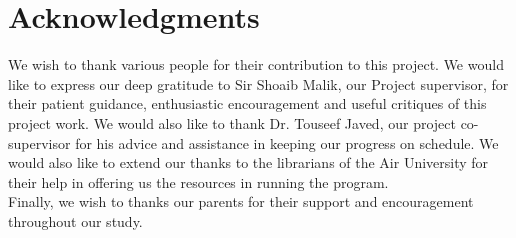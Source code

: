 \chapter*{Acknowledgments}

We wish to thank various people for their contribution to this project. We would like to express our deep gratitude to Sir Shoaib Malik, our Project supervisor, for their patient guidance, enthusiastic encouragement and useful critiques of this project work. We would also like to thank Dr. Touseef Javed, our project co-supervisor for his advice and assistance in keeping our progress on schedule. We would also like to extend our thanks to the librarians of the Air University for their help in offering us the resources in running the program.\\

Finally, we wish to thanks our parents for their support and encouragement throughout our study.


\vspace{10mm}



